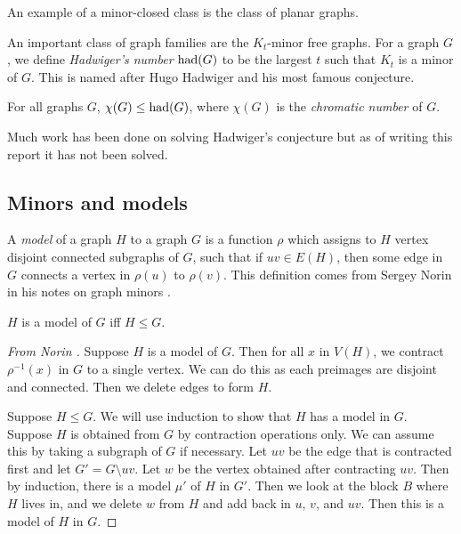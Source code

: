 \begin{example}
	An example of a minor-closed class is the class of planar graphs. 
\end{example}

An important class of graph families are the $K_t$-minor free graphs. For a graph $G$, we define \textit{Hadwiger's number} $\text{had}(G)$ to be the largest $t$ such that $K_t$ is a minor of $G$. This is named after Hugo Hadwiger and his most famous conjecture.

\begin{conjecture}\cite{hadwigerUeberKlassifikationStreckenkomplexe1943}
	For all graphs $G$, $\chi(G) \leq \text{had}(G)$, where $\chi(G)$ is the \textit{chromatic number} of $G$. 
\end{conjecture}
Much work has been done on solving Hadwiger's conjecture but as of writing this report it has not been solved. 
\subsection{Minors and models}
A \textit{model} of a graph $H$ to a graph $G$ is a function $\rho$ which assigns to $H$ vertex disjoint connected subgraphs of $G$, such that if $uv \in E(H)$, then some edge in $G$ connects a vertex in $\rho(u)$ to $\rho(v)$. This definition comes from Sergey Norin in his notes on graph minors \cite{norinMath599GraphMinors2017}. 

\begin{theorem}
	$H$ is a model of $G$ iff $ H \leq G$. 
\end{theorem}

\begin{proof}[From Norin \cite{norinMath599GraphMinors2017}]
	Suppose $H$ is a model of $G$. Then for all $x$ in $V(H)$, we contract $\rho^{-1}(x)$ in $G$ to a single vertex. We can do this as each preimages are disjoint and connected. Then we delete edges to form $H$. 
	
	Suppose $H \leq G$. We will use induction to show that $H$ has a model in $G$. Suppose $H$ is obtained from $G$ by contraction operations only. We can assume this by taking a subgraph of $G$ if necessary. Let $uv$ be the edge that is contracted first and let $G' = G \setminus uv$. Let $w$ be the vertex obtained after contracting $uv$. Then by induction, there is a model $\mu'$ of $H$ in $G'$. Then we look at the block $B$ where $H$ lives in, and we delete $w$ from $H$ and add back in $u$, $v$, and $uv$. Then this is a model of $H$ in $G$. 
\end{proof}
